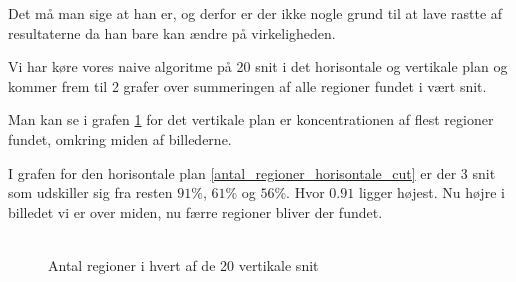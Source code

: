 Det må man sige at han er, og derfor er der ikke nogle grund til at lave
rastte af resultaterne da han bare kan ændre på virkeligheden.

Vi har køre vores naive algoritme på 20 snit i det horisontale og
vertikale plan og kommer frem til 2 grafer over summeringen af alle
regioner fundet i vært snit. 

Man kan se i grafen \ref{antal_regioner_vertikale_cut} for det vertikale
plan er koncentrationen af flest regioner fundet, omkring miden af
billederne.

I grafen for den horisontale plan \ref{antal_regioner_horisontale_cut}
er der 3 snit som udskiller sig fra resten $91\%$, $61\%$ og $56\%$.
Hvor $0.91$ ligger højest. Nu højre i billedet vi er over miden, nu
færre regioner bliver der fundet.
 
\begin{figure}[h!]
	\begin{center}
		\includegraphics[width=0.9]{afsnit/resultater/billeder/cut0cut1eatsperratio.png}
	\end{center}
	\caption{Antal regioner i hvert af de 20 vertikale snit}
	\label{antal_regioner_vertikale_cut}
\end{figure}


